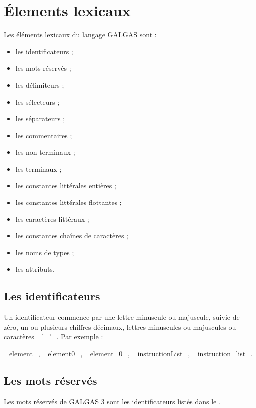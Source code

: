 
\chapter{Élements lexicaux}

Les éléments lexicaux du langage GALGAS sont :
\begin{itemize}
  \item les identificateurs ;
  \item les mots réservés ;
  \item les délimiteurs ;
  \item les sélecteurs ;
  \item les séparateurs ;
  \item les commentaires ;
  \item les non terminaux ;
  \item les terminaux ;
  \item les constantes littérales entières ;
  \item les constantes littérales flottantes ;
  \item les caractères littéraux  ;
  \item les constantes chaînes de caractères ;
  \item les noms de types ;
  \item les attributs.
\end{itemize}


\section{Les identificateurs}

Un identificateur commence par une lettre minuscule ou majuscule, suivie de zéro, un ou plusieurs chiffres décimaux, lettres minuscules ou majuscules ou caractères \ggs='_'=. Par exemple :

\ggs=element=, \ggs=element0=, \ggs=element_0=, \ggs=instructionList=, \ggs=instruction_list=.

\section{Les mots réservés}

Les mots réservés de GALGAS 3 sont les identificateurs listés dans le .

